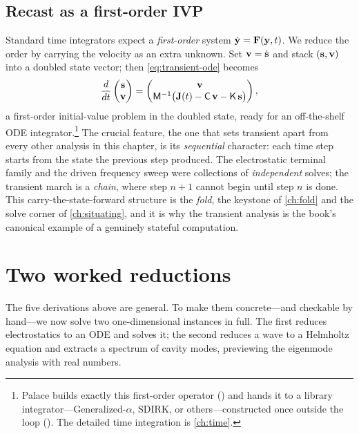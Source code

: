 \subsection{Recast as a first-order IVP}

Standard time integrators expect a \emph{first-order} system $\dot{\mathbf{y}} =
\mathbf{F}(\mathbf{y},t)$. We reduce the order by carrying the velocity as an extra unknown.
Set $\mathbf{v} = \dot{\mathbf{s}}$ and stack $(\mathbf{s},\mathbf{v})$ into a doubled state vector; then
\cref{eq:transient-ode} becomes
\begin{equation}
  \frac{d}{dt}\begin{pmatrix}\mathbf{s}\\\mathbf{v}\end{pmatrix}
  =
  \begin{pmatrix}
    \mathbf{v}\\
    \mathsf{M}^{-1}\bigl(\mathbf{J}(t) - \mathsf{C}\,\mathbf{v} - \mathsf{K}\,\mathbf{s}\bigr)
  \end{pmatrix},
  \label{eq:transient-firstorder}
\end{equation}
a first-order initial-value problem in the doubled state, ready for an
off-the-shelf ODE integrator.\footnote{Palace builds exactly this first-order
operator () and hands it to a library
integrator---Generalized-$\alpha$, SDIRK, or others---constructed once outside
the loop (). The detailed time
integration is \cref{ch:time}.} The crucial feature, the one that sets transient
apart from every other analysis in this chapter, is its \emph{sequential}
character: each time step starts from the state the previous step produced. The
electrostatic terminal family and the driven frequency sweep were collections of
\emph{independent} solves; the transient march is a \emph{chain}, where step
$n{+}1$ cannot begin until step $n$ is done. This carry-the-state-forward
structure is the \emph{fold}, the keystone of \cref{ch:fold} and the solve corner
of \cref{ch:situating}, and it is why the transient analysis is the book's
canonical example of a genuinely stateful computation.

\section{Two worked reductions}
\label{sec:worked}

The five derivations above are general. To make them concrete---and checkable by
hand---we now solve two one-dimensional instances in full. The first reduces
electrostatics to an ODE and solves it; the second reduces a wave to a Helmholtz
equation and extracts a spectrum of cavity modes, previewing the eigenmode
analysis with real numbers.

